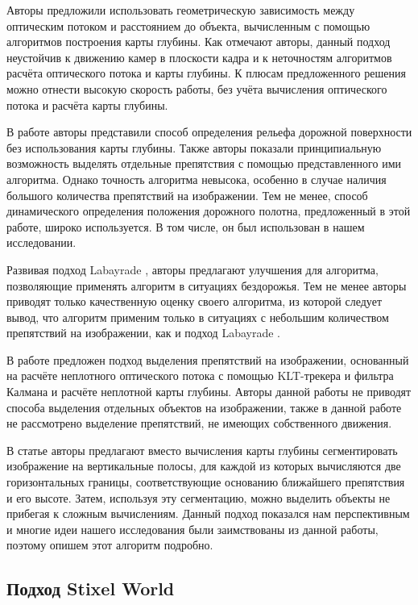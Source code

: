 \documentclass[aps,%
14pt,%
final,%
oneside,
onecolumn,%
musixtex, %
superscriptaddress,%
centertags]{extarticle} %
\begin{document}
Авторы \cite{heinrich2002fast} предложили использовать геометрическую зависимость между оптическим потоком и расстоянием до объекта, вычисленным с помощью алгоритмов построения карты глубины. Как отмечают авторы, данный подход неустойчив к движению камер в плоскости кадра и к неточностям алгоритмов расчёта оптического потока и карты глубины. К плюсам предложенного решения можно отнести высокую скорость работы, без учёта вычисления оптического потока и расчёта карты глубины.

В работе \cite{labayrade2002real} авторы представили способ определения рельефа дорожной поверхности без использования карты глубины. Также авторы показали принципиальную возможность выделять отдельные препятствия с помощью представленного ими алгоритма. Однако точность алгоритма невысока, особенно в случае наличия большого количества препятствий на изображении. Тем не менее, способ динамического определения положения дорожного полотна, предложенный в этой работе, широко используется. В том числе, он был использован в нашем исследовании.

Развивая подход Labayrade \cite{labayrade2002real}, авторы \cite{broggi2006single} предлагают улучшения для алгоритма, позволяющие применять алгоритм в ситуациях бездорожья. Тем не менее авторы приводят только качественную оценку своего алгоритма, из которой следует вывод, что алгоритм применим только в ситуациях с небольшим количеством препятствий на изображении, как и подход Labayrade  \cite{labayrade2002real}.

В работе \cite{franke20056d} предложен подход выделения препятствий на изображении, основанный на расчёте неплотного оптического потока с помощью KLT-трекера и фильтра Калмана и расчёте неплотной карты глубины. Авторы данной работы не приводят способа выделения отдельных объектов на изображении, также в данной работе не рассмотрено выделение препятствий, не имеющих собственного движения.

В статье \cite{pfeiffer2010efficient} авторы предлагают вместо вычисления карты глубины сегментировать изображение на вертикальные полосы, для каждой из которых вычисляются две горизонтальных границы, соответствующие основанию ближайшего препятствия и его высоте. Затем, используя эту сегментацию, можно выделить объекты не прибегая к сложным вычислениям. Данный подход показался нам перспективным и многие идеи нашего исследования были заимствованы из данной работы, поэтому опишем этот алгоритм подробно.


\subsection{Подход Stixel World}
\end{document}
